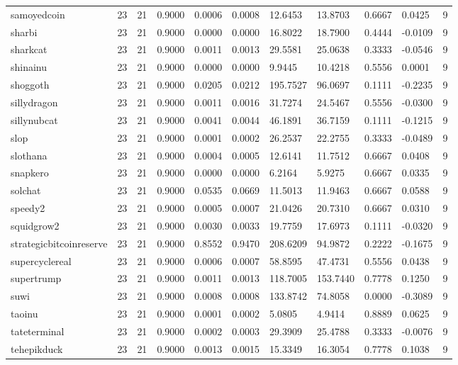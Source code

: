 \begin{table}[htbp]
\begin{tabular}{lllllllllll}
samoyedcoin & 23 & 21 & 0.9000 & 0.0006 & 0.0008 & 12.6453 & 13.8703 & 0.6667 & 0.0425 & 9 \\
sharbi & 23 & 21 & 0.9000 & 0.0000 & 0.0000 & 16.8022 & 18.7900 & 0.4444 & -0.0109 & 9 \\
sharkcat & 23 & 21 & 0.9000 & 0.0011 & 0.0013 & 29.5581 & 25.0638 & 0.3333 & -0.0546 & 9 \\
shinainu & 23 & 21 & 0.9000 & 0.0000 & 0.0000 & 9.9445 & 10.4218 & 0.5556 & 0.0001 & 9 \\
shoggoth & 23 & 21 & 0.9000 & 0.0205 & 0.0212 & 195.7527 & 96.0697 & 0.1111 & -0.2235 & 9 \\
sillydragon & 23 & 21 & 0.9000 & 0.0011 & 0.0016 & 31.7274 & 24.5467 & 0.5556 & -0.0300 & 9 \\
sillynubcat & 23 & 21 & 0.9000 & 0.0041 & 0.0044 & 46.1891 & 36.7159 & 0.1111 & -0.1215 & 9 \\
slop & 23 & 21 & 0.9000 & 0.0001 & 0.0002 & 26.2537 & 22.2755 & 0.3333 & -0.0489 & 9 \\
slothana & 23 & 21 & 0.9000 & 0.0004 & 0.0005 & 12.6141 & 11.7512 & 0.6667 & 0.0408 & 9 \\
snapkero & 23 & 21 & 0.9000 & 0.0000 & 0.0000 & 6.2164 & 5.9275 & 0.6667 & 0.0335 & 9 \\
solchat & 23 & 21 & 0.9000 & 0.0535 & 0.0669 & 11.5013 & 11.9463 & 0.6667 & 0.0588 & 9 \\
speedy2 & 23 & 21 & 0.9000 & 0.0005 & 0.0007 & 21.0426 & 20.7310 & 0.6667 & 0.0310 & 9 \\
squidgrow2 & 23 & 21 & 0.9000 & 0.0030 & 0.0033 & 19.7759 & 17.6973 & 0.1111 & -0.0320 & 9 \\
strategicbitcoinreserve & 23 & 21 & 0.9000 & 0.8552 & 0.9470 & 208.6209 & 94.9872 & 0.2222 & -0.1675 & 9 \\
supercyclereal & 23 & 21 & 0.9000 & 0.0006 & 0.0007 & 58.8595 & 47.4731 & 0.5556 & 0.0438 & 9 \\
supertrump & 23 & 21 & 0.9000 & 0.0011 & 0.0013 & 118.7005 & 153.7440 & 0.7778 & 0.1250 & 9 \\
suwi & 23 & 21 & 0.9000 & 0.0008 & 0.0008 & 133.8742 & 74.8058 & 0.0000 & -0.3089 & 9 \\
taoinu & 23 & 21 & 0.9000 & 0.0001 & 0.0002 & 5.0805 & 4.9414 & 0.8889 & 0.0625 & 9 \\
tateterminal & 23 & 21 & 0.9000 & 0.0002 & 0.0003 & 29.3909 & 25.4788 & 0.3333 & -0.0076 & 9 \\
tehepikduck & 23 & 21 & 0.9000 & 0.0013 & 0.0015 & 15.3349 & 16.3054 & 0.7778 & 0.1038 & 9 \\

\end{tabular}
\end{table}
